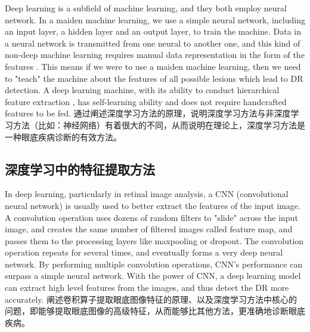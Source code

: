 \documentclass{ijisa}
\begin{document}
Deep learning is a subfield of machine learning, and they both employ neural network. In a maiden machine learning, we use a simple neural network, including an input layer, a hidden layer and an output layer, to train the machine. Data in a neural network is transmitted from one neural to another one, and this kind of non-deep machine learning requires manual data representation in the form of the features \cite{badar2020application}. This means if we were to use a maiden machine learning, then we need to "teach" the machine about the features of all possible lesions which lead to DR detection. A deep learning machine, with its ability to conduct hierarchical feature extraction \cite{badar2020application}, has self-learning ability and does not require handcrafted features to be fed.
通过阐述深度学习方法的原理，说明深度学习方法与非深度学习方法（比如：神经网络）有着很大的不同，从而说明在理论上，深度学习方法是一种眼底疾病诊断的有效方法。

\subsection{深度学习中的特征提取方法}
In deep learning, particularly in retinal image analysis, a CNN (convolutional neural network) is usually used to better extract the features of the input image. A convolution operation uses dozens of random filters to "slide" across the input image, and creates the same number of filtered images called feature map, and passes them to the processing layers like maxpooling or dropout. The convolution operation repeats for several times, and eventually forms a very deep neural network. By performing multiple convolution operations, CNN's performance can 
surpass a simple neural network. With the power of CNN, a deep learning model can extract high level features from the images, and thus detect the DR more accurately.
阐述卷积算子提取眼底图像特征的原理、以及深度学习方法中核心的问题，即能够提取眼底图像的高级特征，从而能够比其他方法，更准确地诊断眼底疾病。
\end{document}
